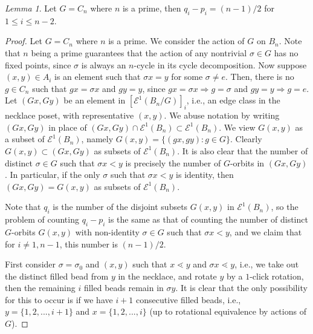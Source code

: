 \documentclass[10 pt]{amsart}
\theoremstyle{plain}
\theoremstyle{definition}
\theoremstyle{remark}
\numberwithin{equation}{section}
\newtheorem{lem}[thm]{Lemma}
\theoremstyle{remark}
\newcommand{\so}{\Rightarrow}
\begin{document}
\begin{lem}{\label{lem:cyclicprime}}
Let $G = C_n$ where $n$ is a prime, then $q_i - p_i = (n-1)/2$ for $ 1 \le i \le n-2$. 
\end{lem}

\begin{proof} 
Let $G = C_n$ where $n$ is a prime. We consider the action of $G$ on $B_n$. 
 Note that $n$ being a prime guarantees that the action of any nontrivial $\sigma \in G$ has no fixed points, since $\sigma$ is always an $n$-cycle in its cycle decomposition. Now suppose $(x, y) \in A_i$   is an element such that $\sigma x =y$ for some $\sigma \neq e$. Then, there is no $g \in C_n$ such that $gx = \sigma x$ and $g y = y$, since $gx = \sigma x \so g = \sigma $ and $g y = y \so g = e$. Let $(Gx, Gy)$  be an element in $[\mathcal E^1(B_n/G)]_i$, i.e., an edge class in the necklace poset, with representative $(x, y)$. We abuse notation by writing $(Gx, Gy)$ in place of $(Gx, Gy) \cap \mathcal E^1(B_n) \subset \mathcal E^1(B_n)$. We view $G(x , y)$ as a subset of $\mathcal E^1 (B_n)$, namely $G(x, y) = \{(gx, g y) : g \in G \}$. Clearly $G(x , y) \subset (Gx,Gy)$ as subsets of $\mathcal E^1 (B_n)$. It is also clear that the number of distinct $\sigma \in G$ such that $\sigma x < y$ is precisely the number of $G$-orbits in $(Gx, Gy)$. In particular, if the only $\sigma $ such that $\sigma x < y$ is identity, then $(Gx, Gy)=G(x, y)$ as subsets of $\mathcal E^1 (B_n)$. 

Note that $q_i$ is the number of the disjoint subsets $G(x, y)$ in $\mathcal E^1 (B_n)$, so the problem of counting $q_i - p_i$ is the same as that of counting the number of distinct $G$-orbits $G(x , y)$  with non-identity $\sigma \in G$ such that $\sigma x < y$, and we claim that for $i\neq 1,n-1$, this number is $(n-1)/2$. 


First consider $\sigma = \sigma_0$ and $(x,y)$ such that $x \lessdot y$ and $\sigma x \lessdot y$, i.e., we take out the distinct filled bead from $y$ in the necklace, and rotate $y$ by a $1$-click rotation, then the remaining $i$ filled beads remain in $\sigma y$.  It is clear that the only possibility for this to occur is if we have $i+1$ consecutive filled beads, i.e., $y = \{1, 2, ..., i+1\}$ and $x = \{1, 2, ..., i \}$ (up to rotational equivalence by actions of $G$). 


\end{proof}
\end{document}
